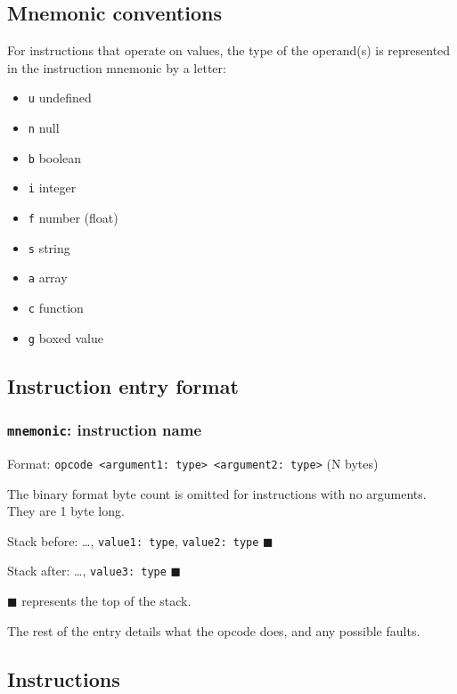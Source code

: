 \subsection{Mnemonic conventions}
\label{sec:org6c2c333}
For instructions that operate on values, the type of the operand(s) is
represented in the instruction mnemonic by a letter:

\begin{itemize}
\item \texttt{u} undefined

\item \texttt{n} null

\item \texttt{b} boolean

\item \texttt{i} integer

\item \texttt{f} number (float)

\item \texttt{s} string

\item \texttt{a} array

\item \texttt{c} function

\item \texttt{g} boxed value
\end{itemize}

\subsection{Instruction entry format}
\label{sec:org6af44d0}
\subsubsection{\texttt{mnemonic}: instruction name}
\label{sec:org91c15ea}
Format: \texttt{opcode <argument1: type> <argument2: type>} (N bytes)

The binary format byte count is omitted for instructions with no
arguments. They are 1 byte long.

Stack before: \ldots{}, \texttt{value1: type}, \texttt{value2: type} \(\blacksquare\)

Stack after: \ldots{}, \texttt{value3: type} \(\blacksquare\)

\(\blacksquare\) represents the top of the stack.

The rest of the entry details what the opcode does, and any possible
faults.

\subsection{Instructions}
\label{sec:org33d7595}
